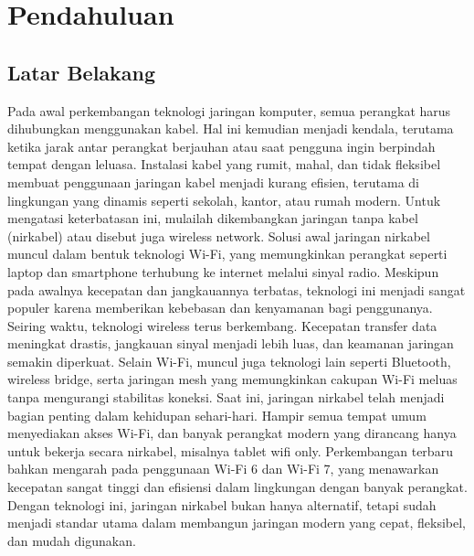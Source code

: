 \section{Pendahuluan}
\subsection{Latar Belakang}
Pada awal perkembangan teknologi jaringan komputer, semua perangkat harus dihubungkan menggunakan kabel. Hal ini kemudian menjadi kendala, terutama ketika jarak antar perangkat berjauhan atau saat pengguna ingin berpindah tempat dengan leluasa. Instalasi kabel yang rumit, mahal, dan tidak fleksibel membuat penggunaan jaringan kabel menjadi kurang efisien, terutama di lingkungan yang dinamis seperti sekolah, kantor, atau rumah modern. Untuk mengatasi keterbatasan ini, mulailah dikembangkan jaringan tanpa kabel (nirkabel) atau disebut juga wireless network. Solusi awal jaringan nirkabel muncul dalam bentuk teknologi Wi-Fi, yang memungkinkan perangkat seperti laptop dan smartphone terhubung ke internet melalui sinyal radio. Meskipun pada awalnya kecepatan dan jangkauannya terbatas, teknologi ini menjadi sangat populer karena memberikan kebebasan dan kenyamanan bagi penggunanya. Seiring waktu, teknologi wireless terus berkembang. Kecepatan transfer data meningkat drastis, jangkauan sinyal menjadi lebih luas, dan keamanan jaringan semakin diperkuat. Selain Wi-Fi, muncul juga teknologi lain seperti Bluetooth, wireless bridge, serta jaringan mesh yang memungkinkan cakupan Wi-Fi meluas tanpa mengurangi stabilitas koneksi. Saat ini, jaringan nirkabel telah menjadi bagian penting dalam kehidupan sehari-hari. Hampir semua tempat umum menyediakan akses Wi-Fi, dan banyak perangkat modern yang dirancang hanya untuk bekerja secara nirkabel, misalnya tablet wifi only. Perkembangan terbaru bahkan mengarah pada penggunaan Wi-Fi 6 dan Wi-Fi 7, yang menawarkan kecepatan sangat tinggi dan efisiensi dalam lingkungan dengan banyak perangkat. Dengan teknologi ini, jaringan nirkabel bukan hanya alternatif, tetapi sudah menjadi standar utama dalam membangun jaringan modern yang cepat, fleksibel, dan mudah digunakan.

